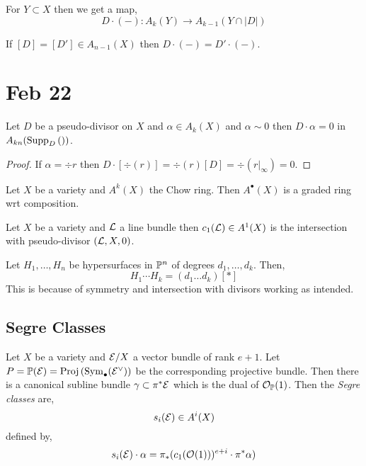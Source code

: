 \documentclass[12pt]{article}
\begin{document}
\begin{cor}
For $Y \subset X$ then we get a map,
\[ D \cdot (-) : A_k(Y) \to A_{k-1}(Y \cap |D|) \]
\end{cor}

\begin{rmk}
If $[D] = [D'] \in A_{n-1}(X)$ then $D \cdot (-) = D' \cdot (-)$. 
\end{rmk}

\section{Feb 22}

\begin{cor}
Let $D$ be a pseudo-divisor on $X$ and $\alpha \in A_k(X)$ and $\alpha \sim 0$ then $D \cdot \alpha = 0$ in $A_{kn}(\Supp{D})$. 
\end{cor}

\begin{proof}
If $\alpha = \div{r}$ then $D \cdot [\div(r)] = \div(r) [D] = \div(r|_\infty) = 0$.
\end{proof}

\begin{defn}
Let $X$ be a variety and $A^k(X)$ the Chow ring.
Then $A^\bullet(X)$ is a graded ring wrt composition.
\end{defn}

\begin{defn}
Let $X$ be a variety and $\L$ a line bundle then $c_1(\L) \in A^1(X)$ is the intersection with pseudo-divisor $(\L, X, 0)$.
\end{defn}

\begin{prop}

\end{prop}

\begin{example}
Let $H_1, \dots, H_n$ be hypersurfaces in $\P^n$ of degrees $d_1, \dots, d_k$. Then,
\[ H_1 \cdots H_k = (d_1 \dots d_k) [*] \]
This is because of symmetry and intersection with divisors working as intended. 
\end{example}

\subsection{Segre Classes}

\begin{defn}
Let $X$ be a variety and $\E / X$ a vector bundle of rank $e + 1$. Let $P = \P(\E) = \Proj{\Sym{\bullet}{\E^\vee}}$ be the corresponding projective bundle. Then there is a canonical subline bundle $\gamma \subset \pi^* \E$ which is the dual of $\struct{\P}(1)$. Then the \textit{Segre classes} are,
\[ s_i(\E) \in A^i(X) \]
defined by,
\[ s_i(\E) \cdot \alpha = \pi_* (c_1(\struct{}(1)))^{e + i} \cdot \pi^* \alpha) \]
\end{defn}
\end{document}
